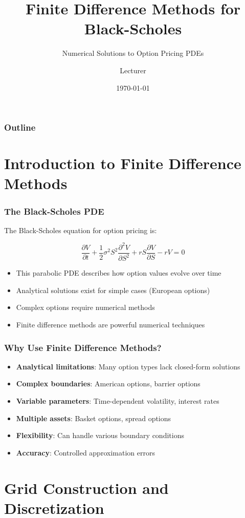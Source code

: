 \documentclass{beamer}
\title{Finite Difference Methods for Black-Scholes}
\subtitle{Numerical Solutions to Option Pricing PDEs}
\author{Lecturer}
\date{\today}
\begin{document}
\begin{frame}
\titlepage
\end{frame}

\begin{frame}
\frametitle{Outline}
\tableofcontents
\end{frame}

\section{Introduction to Finite Difference Methods}

\begin{frame}
\frametitle{The Black-Scholes PDE}
The Black-Scholes equation for option pricing is:

$$\frac{\partial V}{\partial t} + \frac{1}{2}\sigma^2 S^2 \frac{\partial^2 V}{\partial S^2} + rS \frac{\partial V}{\partial S} - rV = 0$$

\begin{itemize}
\item This parabolic PDE describes how option values evolve over time
\item Analytical solutions exist for simple cases (European options)
\item Complex options require numerical methods
\item Finite difference methods are powerful numerical techniques
\end{itemize}
\end{frame}

\begin{frame}
\frametitle{Why Use Finite Difference Methods?}
\begin{itemize}
\item \textbf{Analytical limitations}: Many option types lack closed-form solutions
\item \textbf{Complex boundaries}: American options, barrier options
\item \textbf{Variable parameters}: Time-dependent volatility, interest rates
\item \textbf{Multiple assets}: Basket options, spread options
\item \textbf{Flexibility}: Can handle various boundary conditions
\item \textbf{Accuracy}: Controlled approximation errors
\end{itemize}
\end{frame}

\section{Grid Construction and Discretization}
\end{document}
